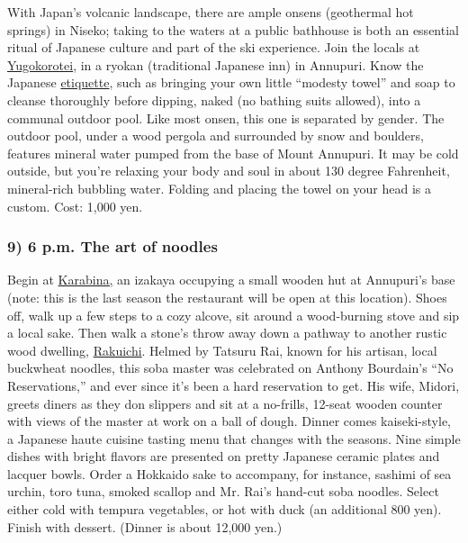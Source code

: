 With Japan's volcanic landscape, there are ample onsens (geothermal hot
springs) in Niseko; taking to the waters at a public bathhouse is both
an essential ritual of Japanese culture and part of the ski experience.
Join the locals at
\href{http://www.niseko-annupurionsen.com}{Yugokorotei}, in a ryokan
(traditional Japanese inn) in Annupuri. Know the Japanese
\href{http://www.jnto.org.au/experience/onsen/onsen-etiquette}{etiquette},
such as bringing your own little ``modesty towel'' and soap to cleanse
thoroughly before dipping, naked (no bathing suits allowed), into a
communal outdoor pool. Like most onsen, this one is separated by gender.
The outdoor pool, under a wood pergola and surrounded by snow and
boulders, features mineral water pumped from the base of Mount Annupuri.
It may be cold outside, but you're relaxing your body and soul in about
130 degree Fahrenheit, mineral-rich bubbling water. Folding and placing
the towel on your head is a custom. Cost: 1,000 yen.

\hypertarget{9-6-pm-the-art-of-noodles}{%
\subsubsection{9) 6 p.m. The art of
noodles}\label{9-6-pm-the-art-of-noodles}}

Begin at \href{https://www.karabinaniseko.com/}{Karabina,} an izakaya
occupying a small wooden hut at Annupuri's base (note: this is the last
season the restaurant will be open at this location). Shoes off, walk up
a few steps to a cozy alcove, sit around a wood-burning stove and sip a
local sake. Then walk a stone's throw away down a pathway to another
rustic wood dwelling, \href{http://www.rakuichisoba.com}{Rakuichi}.
Helmed by Tatsuru Rai, known for his artisan, local buckwheat noodles,
this soba master was celebrated on Anthony Bourdain's ``No
Reservations,'' and ever since it's been a hard reservation to get. His
wife, Midori, greets diners as they don slippers and sit at a no-frills,
12-seat wooden counter with views of the master at work on a ball of
dough. Dinner comes kaiseki-style, a Japanese haute cuisine tasting menu
that changes with the seasons. Nine simple dishes with bright flavors
are presented on pretty Japanese ceramic plates and lacquer bowls. Order
a Hokkaido sake to accompany, for instance, sashimi of sea urchin, toro
tuna, smoked scallop and Mr. Rai's hand-cut soba noodles. Select either
cold with tempura vegetables, or hot with duck (an additional 800 yen).
Finish with dessert. (Dinner is about 12,000 yen.)

